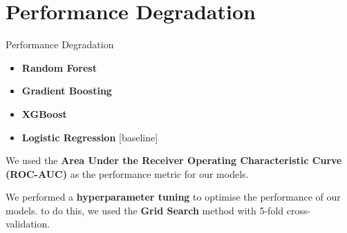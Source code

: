 \section{Performance Degradation} \label{sec:performance-degradation}

\begin{frame}{Performance Degradation}

    
    \begin{itemize}
        \item \textbf{Random Forest}
        \item \textbf{Gradient Boosting}
        \item \textbf{XGBoost}
        \item \textbf{Logistic Regression} [baseline]
    \end{itemize}

    
    We used the \textbf{Area Under the Receiver Operating Characteristic Curve (ROC-AUC)} as the performance metric for our models.

    
    We performed a \textbf{hyperparameter tuning} to optimise the performance of our models. to do this, we used the \textbf{Grid Search} method with 5-fold cross-validation.

\end{frame}

